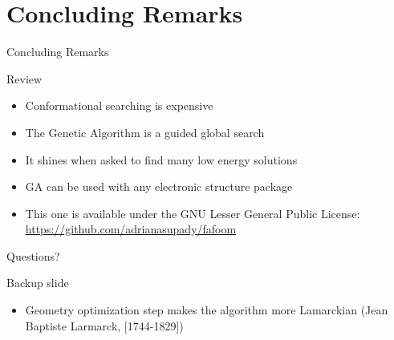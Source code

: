 \documentclass[10pt]{beamer}
\begin{document}
{{\section{Concluding Remarks}

{%
\begin{frame}{Concluding Remarks}
    \begin{block}{Review}
    	\begin{itemize}[<+->]
    		\item {Conformational searching is expensive}
    		\item {The Genetic Algorithm is a guided global search}
    		\item {It shines when asked to find many low energy solutions}
    		\item {GA can be used with any electronic structure package}
    		\item {This one is available under the GNU Lesser General Public License:
            		\url{https://github.com/adrianasupady/fafoom}}
    	\end{itemize}
    \end{block}
\end{frame}
}


\begin{frame}[standout]
  Questions?
\end{frame}

\appendix

\begin{frame}[fragile]{Backup slide}
	\begin{itemize}
		\item Geometry optimization step makes the algorithm more Lamarckian (Jean Baptiste Larmarck, [1744-1829])
	\end{itemize}
\end{frame}

{%
}}}
\end{document}
